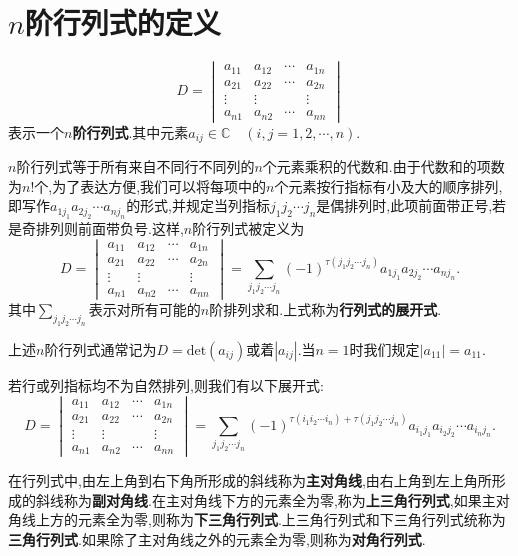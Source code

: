 \documentclass[9pt,a4paper]{book}
\begin{document}
\section{$ n $阶行列式的定义}
\begin{defination}[$ n $阶行列式的定义]
\[ 	D = {\begin{vmatrix}
		{{a_{11}}}&{{a_{12}}}& \cdots &{{a_{1n}}}\\
		{{a_{21}}}&{{a_{22}}}& \cdots &{{a_{2n}}}\\
		\vdots & \vdots &\;& \vdots \\
		{{a_{n1}}}&{{a_{n2}}}& \cdots &{{a_{nn}}}
		\end{vmatrix}} \]表示一个\textbf{$ n $阶行列式}.其中元素$ a_{ij}\in \mathbb{C}\quad(i,j=1,2,\cdots,n) $.
\end{defination}
\begin{defination}
	$ n $阶行列式等于所有来自不同行不同列的$ n $个元素乘积的代数和.由于代数和的项数为$ n! $个,为了表达方便,我们可以将每项中的$ n $个元素按行指标有小及大的顺序排列,即写作$ a_{1j_1}a_{2j_2}\cdots a_{nj_n} $的形式,并规定当列指标$ j_1j_2\cdots j_n $是偶排列时,此项前面带正号,若是奇排列则前面带负号.这样,$ n $阶行列式被定义为\[ 	D = {\begin{vmatrix}
		{{a_{11}}}&{{a_{12}}}& \cdots &{{a_{1n}}}\\
		{{a_{21}}}&{{a_{22}}}& \cdots &{{a_{2n}}}\\
		\vdots & \vdots &\;& \vdots \\
		{{a_{n1}}}&{{a_{n2}}}& \cdots &{{a_{nn}}}
		\end{vmatrix}}=\sum_{j_1j_2\cdots j_n}{{(-1)}^{\tau (j_1j_2\cdots j_n)} a_{1j_1}a_{2j_2}\cdots a_{nj_n}}. \]其中$ \displaystyle \sum_{j_1j_2\cdots j_n} $表示对所有可能的$ n $阶排列求和.上式称为\textbf{行列式的展开式}.
	
	上述$ n $阶行列式通常记为$ D=\mathrm{det}(a_{ij}) $或着$ |a_{ij}| $.当$ n=1 $时我们规定$ |a_{11}|=a_{11} $.
	
	若行或列指标均不为自然排列,则我们有以下展开式:\[ 	D = {\begin{vmatrix}
		{{a_{11}}}&{{a_{12}}}& \cdots &{{a_{1n}}}\\
		{{a_{21}}}&{{a_{22}}}& \cdots &{{a_{2n}}}\\
		\vdots & \vdots &\;& \vdots \\
		{{a_{n1}}}&{{a_{n2}}}& \cdots &{{a_{nn}}}
		\end{vmatrix}}=\sum_{j_1j_2\cdots j_n}{{(-1)}^{\tau(i_1i_2\cdots i_n)+\tau (j_1j_2\cdots j_n)} a_{i_1j_1}a_{i_2j_2}\cdots a_{i_nj_n}}. \]
\end{defination}
\begin{defination}
	在行列式中,由左上角到右下角所形成的斜线称为\textbf{主对角线},由右上角到左上角所形成的斜线称为\textbf{副对角线}.在主对角线下方的元素全为零,称为\textbf{上三角行列式},如果主对角线上方的元素全为零,则称为\textbf{下三角行列式}.上三角行列式和下三角行列式统称为\textbf{三角行列式}.如果除了主对角线之外的元素全为零,则称为\textbf{对角行列式}.
\end{defination}
\end{document}
